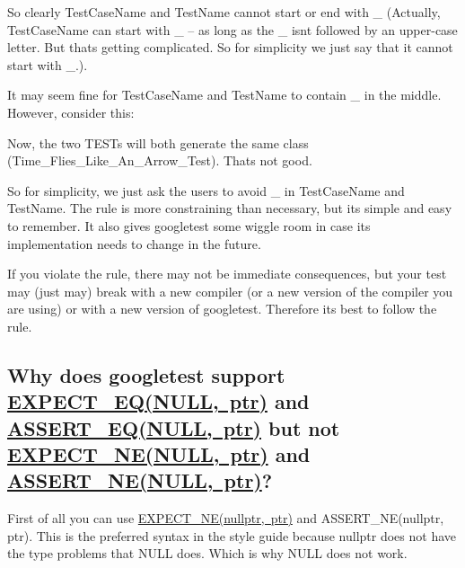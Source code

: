 So clearly {\ttfamily Test\+Case\+Name} and {\ttfamily Test\+Name} cannot start or end with {\ttfamily \+\_\+} (Actually, {\ttfamily Test\+Case\+Name} can start with {\ttfamily \+\_\+} -- as long as the {\ttfamily \+\_\+} isn\textquotesingle{}t followed by an upper-\/case letter. But that\textquotesingle{}s getting complicated. So for simplicity we just say that it cannot start with {\ttfamily \+\_\+}.).

It may seem fine for {\ttfamily Test\+Case\+Name} and {\ttfamily Test\+Name} to contain {\ttfamily \+\_\+} in the middle. However, consider this\+:


\begin{DoxyCode}{0}
\end{DoxyCode}


Now, the two {\ttfamily T\+E\+ST}s will both generate the same class ({\ttfamily Time\+\_\+\+Flies\+\_\+\+Like\+\_\+\+An\+\_\+\+Arrow\+\_\+\+Test}). That\textquotesingle{}s not good.

So for simplicity, we just ask the users to avoid {\ttfamily \+\_\+} in {\ttfamily Test\+Case\+Name} and {\ttfamily Test\+Name}. The rule is more constraining than necessary, but it\textquotesingle{}s simple and easy to remember. It also gives googletest some wiggle room in case its implementation needs to change in the future.

If you violate the rule, there may not be immediate consequences, but your test may (just may) break with a new compiler (or a new version of the compiler you are using) or with a new version of googletest. Therefore it\textquotesingle{}s best to follow the rule.

\subsection*{Why does googletest support {\ttfamily \mbox{\hyperlink{gtest_8h_a4159019abda84f5366acdb7604ff220a}{E\+X\+P\+E\+C\+T\+\_\+\+E\+Q(\+N\+U\+L\+L, ptr)}}} and {\ttfamily \mbox{\hyperlink{gtest_8h_a1a6db8b1338ee7040329322b77779086}{A\+S\+S\+E\+R\+T\+\_\+\+E\+Q(\+N\+U\+L\+L, ptr)}}} but not {\ttfamily \mbox{\hyperlink{gtest_8h_a6ae7443947f25abc58bfcfcfc56b0d75}{E\+X\+P\+E\+C\+T\+\_\+\+N\+E(\+N\+U\+L\+L, ptr)}}} and {\ttfamily \mbox{\hyperlink{gtest_8h_aa866c8dece57912e6f51495ed3e8d8d5}{A\+S\+S\+E\+R\+T\+\_\+\+N\+E(\+N\+U\+L\+L, ptr)}}}?}

First of all you can use {\ttfamily \mbox{\hyperlink{gtest_8h_a6ae7443947f25abc58bfcfcfc56b0d75}{E\+X\+P\+E\+C\+T\+\_\+\+N\+E(nullptr, ptr)}}} and {\ttfamily A\+S\+S\+E\+R\+T\+\_\+\+NE(nullptr, ptr)}. This is the preferred syntax in the style guide because nullptr does not have the type problems that N\+U\+LL does. Which is why N\+U\+LL does not work.

